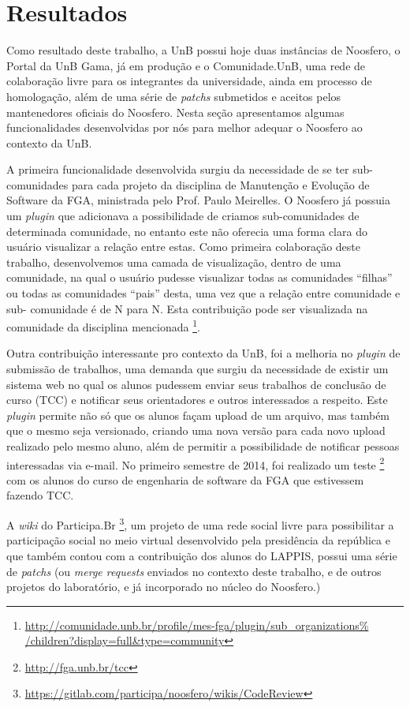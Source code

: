 \section{Resultados}
\label{sec:resultados}

Como resultado deste trabalho, a UnB possui hoje duas instâncias de Noosfero,
o Portal da UnB Gama, já em produção e o Comunidade.UnB, uma rede de colaboração
livre para os integrantes da universidade, ainda em processo de homologação,
além de uma série de \textit{patchs} submetidos e aceitos pelos mantenedores
oficiais do Noosfero. Nesta seção apresentamos algumas funcionalidades
desenvolvidas por nós para melhor adequar o Noosfero ao contexto da UnB.

A primeira funcionalidade desenvolvida surgiu da necessidade de se ter sub-%
comunidades para cada projeto da disciplina de Manutenção e Evolução de
Software da FGA, ministrada pelo Prof. Paulo Meirelles. O Noosfero já possuia
um \textit{plugin} que adicionava a possibilidade de criamos sub-comunidades
de determinada comunidade, no entanto este não oferecia uma forma clara do
usuário visualizar a relação entre estas. Como primeira colaboração deste
trabalho, desenvolvemos uma camada de visualização, dentro de uma comunidade,
na qual o usuário pudesse visualizar todas as comunidades ``filhas'' ou todas
as comunidades ``pais'' desta, uma vez que a relação entre comunidade e sub-%
comunidade é de N para N. Esta contribuição pode ser visualizada na comunidade
da disciplina mencionada%
\footnote{\url{http://comunidade.unb.br/profile/mes-fga/plugin/sub_organizations%
/children?display=full&type=community}}.

Outra contribuição interessante pro contexto da UnB, foi a melhoria no
\textit{plugin} de submissão de trabalhos, uma demanda que surgiu da
necessidade de existir um sistema web no qual os alunos pudessem enviar
seus trabalhos de conclusão de curso (TCC) e notificar seus orientadores e outros
interessados a respeito. Este \textit{plugin} permite não só que os alunos
façam upload de um arquivo, mas também que o mesmo seja versionado, criando
uma nova versão para cada novo upload realizado pelo mesmo aluno, além de
permitir a possibilidade de notificar pessoas interessadas via e-mail.
No primeiro semestre de 2014, foi realizado um teste%
\footnote{\url{http://fga.unb.br/tcc}} com os alunos do curso de engenharia de
software da FGA que estivessem fazendo TCC.

A \textit{wiki} do Participa.Br%
\footnote{\url{https://gitlab.com/participa/noosfero/wikis/CodeReview}},
um projeto de uma rede social livre para
possibilitar a participação social no meio virtual desenvolvido pela
presidência da república e que também contou com a contribuição dos alunos
do LAPPIS, possui uma série de \textit{patchs} (ou \textit{merge requests}
enviados no contexto deste trabalho, e de outros projetos do laboratório, e
já incorporado no núcleo do Noosfero.)
